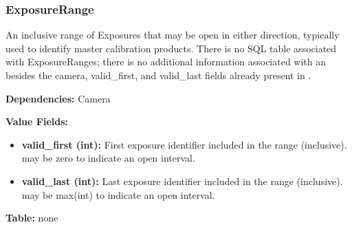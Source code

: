 \subsubsection{ExposureRange}
\label{unit:ExposureRange}

An inclusive range of Exposures that may be open in either direction,
typically used to identify master calibration products. There is no
SQL table associated with ExposureRanges; there is no additional
information associated with an  besides the
camera, valid\_first, and valid\_last fields already present in
.

\textbf{Dependencies:} Camera

\textbf{Value Fields:}
\begin{itemize}
  \item \textbf{valid\_first (int):}
      First exposure identifier included in the range (inclusive).  may
      be zero to indicate an open interval.
  \item \textbf{valid\_last (int):}
      Last exposure identifier included in the range (inclusive).  may
      be max(int) to indicate an open interval.
\end{itemize}

\textbf{Table:} none
